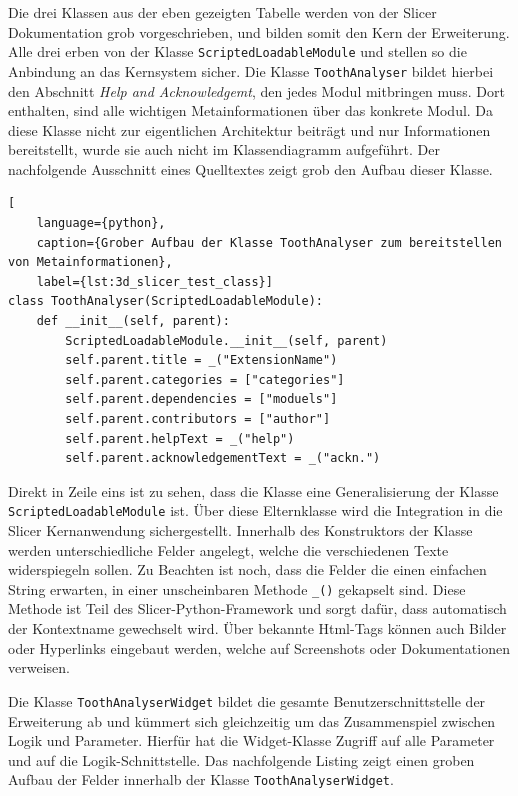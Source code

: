 Die drei Klassen aus der eben gezeigten Tabelle werden von der Slicer Dokumentation
grob vorgeschrieben, und bilden somit den Kern der Erweiterung. Alle drei erben von
der Klasse \texttt{ScriptedLoadableModule} und stellen so die Anbindung an das
Kernsystem sicher. Die Klasse \texttt{ToothAnalyser} bildet hierbei den
Abschnitt \textit{Help and Acknowledgemt}, den jedes Modul mitbringen muss. Dort
enthalten, sind alle wichtigen Metainformationen über das konkrete Modul. Da diese
Klasse nicht zur eigentlichen Architektur beiträgt und nur Informationen bereitstellt,
wurde sie auch nicht im Klassendiagramm aufgeführt. Der nachfolgende Ausschnitt eines
Quelltextes zeigt grob den Aufbau dieser Klasse.

\begin{lstlisting}[
    language={python},
    caption={Grober Aufbau der Klasse ToothAnalyser zum bereitstellen von Metainformationen},
    label={lst:3d_slicer_test_class}]
class ToothAnalyser(ScriptedLoadableModule):
    def __init__(self, parent):
	    ScriptedLoadableModule.__init__(self, parent)
	    self.parent.title = _("ExtensionName")
	    self.parent.categories = ["categories"]
	    self.parent.dependencies = ["moduels"]
	    self.parent.contributors = ["author"]
	    self.parent.helpText = _("help")
	    self.parent.acknowledgementText = _("ackn.")
\end{lstlisting}

Direkt in Zeile eins ist zu sehen, dass die Klasse eine Generalisierung der Klasse
\texttt{ScriptedLoadableModule} ist. Über diese Elternklasse wird die Integration
in die Slicer Kernanwendung sichergestellt. Innerhalb des Konstruktors der
Klasse werden unterschiedliche Felder angelegt, welche die verschiedenen Texte widerspiegeln
sollen. Zu Beachten ist noch, dass die Felder die einen einfachen String erwarten,
in einer unscheinbaren Methode \texttt{\_()} gekapselt sind. Diese Methode ist
Teil des Slicer-Python-Framework und sorgt dafür, dass automatisch der Kontextname
gewechselt wird. Über bekannte Html-Tags können auch Bilder oder Hyperlinks
eingebaut werden, welche auf Screenshots oder Dokumentationen verweisen.

Die Klasse \texttt{ToothAnalyserWidget} bildet die gesamte Benutzerschnittstelle
der Erweiterung ab und kümmert sich gleichzeitig um das Zusammenspiel zwischen
Logik und Parameter. Hierfür hat die Widget-Klasse Zugriff auf alle Parameter und
auf die Logik-Schnittstelle. Das nachfolgende Listing zeigt einen groben Aufbau
der Felder innerhalb der Klasse \texttt{ToothAnalyserWidget}.

